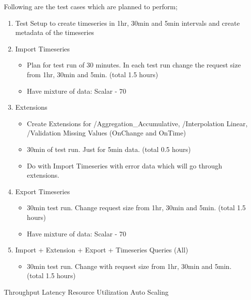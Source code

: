 Following are the test cases which are planned to perform;
\begin{enumerate}
    \item Test Setup to create timeseries in 1hr, 30min and 5min intervals and create metadata of the timeseries
    \item Import Timeseries
    \begin{itemize}
        \item Plan for test run of 30 minutes. In each test run change the request size from 1hr, 30min and 5min. (total 1.5 hours)
        \item Have mixture of data: Scalar - 70%
    \end{itemize}
    \item Extensions
    \begin{itemize}
        \item Create Extensions for /Aggregation\_Accumulative, /Interpolation Linear, /Validation Missing Values (OnChange and OnTime)
        \item 30min of test run. Just for 5min data. (total 0.5 hours)
        \item Do with Import Timeseries with error data which will go through extensions.
    \end{itemize}
    \item Export Timeseries
    \begin{itemize}
        \item 30min test run. Change request size from 1hr, 30min and 5min. (total 1.5 hours)
        \item Have mixture of data: Scalar - 70%
    \end{itemize}
    \item Import + Extension + Export + Timeseries Queries (All)
    \begin{itemize}
        \item 30min test run. Change with request size from 1hr, 30min and 5min. (total 1.5 hours)
    \end{itemize}
\end{enumerate}

Throughput
Latency
Resource Utilization
Auto Scaling